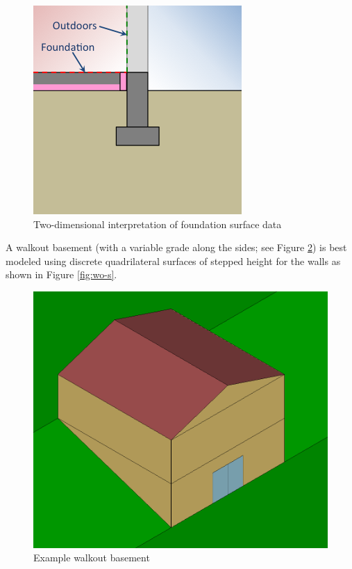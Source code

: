 \begin{figure}
\centering
\includegraphics{media/kiva-2d-whole-slab.png}
\caption{Two-dimensional interpretation of foundation surface
data\label{fig:ws}}
\end{figure}

A walkout basement (with a variable grade along the sides; see Figure
\ref{fig:wo-r}) is best modeled using discrete quadrilateral surfaces of
stepped height for the walls as shown in Figure \ref{fig:wo-s}.

\begin{figure}
\centering
\includegraphics{media/kiva-walkout-real.png}
\caption{Example walkout basement\label{fig:wo-r}}
\end{figure}

